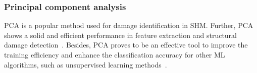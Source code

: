\subsubsection{Principal component analysis}
PCA is a popular method used for damage identification in SHM.
Further, PCA shows a solid and efficient performance in feature extraction and structural damage detection~\cite{liu2014research, wang2014principal, nguyen2010fault}.
Besides, PCA proves to be an effective tool to improve the training efficiency and enhance the classification accuracy for other ML algorithms, such as unsupervised learning methods~\cite{liu2019rapid, datteo2017statistical, torres2014data}.
	
